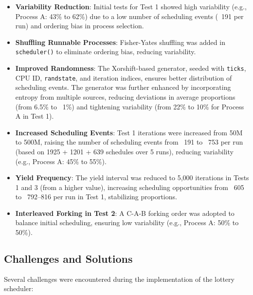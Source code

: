 \documentclass{article}
\begin{document}
\begin{itemize}
    \item \textbf{Variability Reduction}: Initial tests for Test 1 showed high variability (e.g., Process A: 43\% to 62\%) due to a low number of scheduling events (~191 per run) and ordering bias in process selection.
    \item \textbf{Shuffling Runnable Processes}: Fisher-Yates shuffling was added in \texttt{scheduler()} to eliminate ordering bias, reducing variability.
    \item \textbf{Improved Randomness}: The Xorshift-based generator, seeded with \texttt{ticks}, CPU ID, \texttt{randstate}, and iteration indices, ensures better distribution of scheduling events. The generator was further enhanced by incorporating entropy from multiple sources, reducing deviations in average proportions (from 6.5\% to ~1\%) and tightening variability (from 22\% to 10\% for Process A in Test 1).
    \item \textbf{Increased Scheduling Events}: Test 1 iterations were increased from 50M to 500M, raising the number of scheduling events from ~191 to ~753 per run (based on 1925 + 1201 + 639 schedules over 5 runs), reducing variability (e.g., Process A: 45\% to 55\%).
    \item \textbf{Yield Frequency}: The yield interval was reduced to 5,000 iterations in Tests 1 and 3 (from a higher value), increasing scheduling opportunities from ~605 to ~792–816 per run in Test 1, stabilizing proportions.
    \item \textbf{Interleaved Forking in Test 2}: A C-A-B forking order was adopted to balance initial scheduling, ensuring low variability (e.g., Process A: 50\% to 50\%).
\end{itemize}

\subsection{Challenges and Solutions}
Several challenges were encountered during the implementation of the lottery scheduler:
\end{document}
